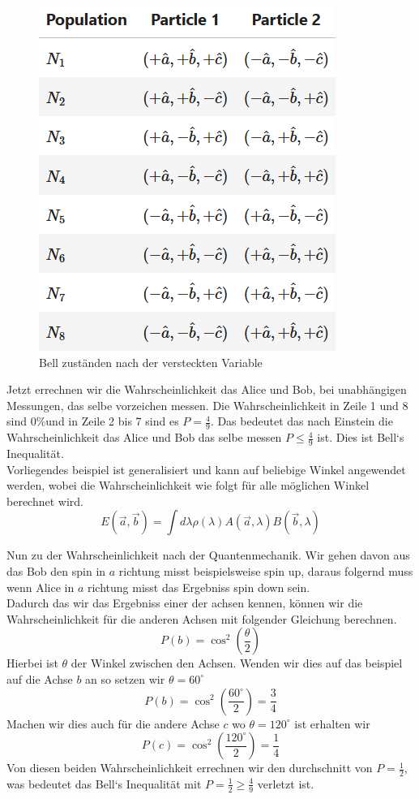 \begin{figure}[H]
    \centering
    \includegraphics[width=0.5\linewidth]{img/BellList.png}
    \caption{Bell zuständen nach der versteckten Variable}
    \label{fig:BellList}
\end{figure}

Jetzt errechnen wir die Wahrscheinlichkeit das Alice und Bob, bei unabhängigen Messungen, das selbe vorzeichen messen. Die Wahrscheinlichkeit in Zeile 1 und 8 sind $0\%$und in Zeile 2 bis 7 sind es $P = \frac{4}{9}$.
Das bedeutet das nach Einstein die Wahrscheinlichkeit das Alice und Bob das selbe messen $P \leq \frac{4}{9}$ ist. Dies ist Bell`s Inequalität.\\
Vorliegendes beispiel ist generalisiert und kann auf beliebige Winkel angewendet werden, wobei die Wahrscheinlichkeit wie folgt für alle möglichen Winkel berechnet wird.
\begin{equation}
    E(\overrightarrow{a}, \overrightarrow{b}) = \int d\lambda \rho(\lambda) A(\overrightarrow{a}, \lambda) B(\overrightarrow{b}, \lambda)
\end{equation}

Nun zu der Wahrscheinlichkeit nach der Quantenmechanik. Wir gehen davon aus das Bob den spin in $a$ richtung misst beispielsweise spin up, daraus folgernd muss wenn Alice in $a$ richtung misst das Ergebniss spin down sein.\\
Dadurch das wir das Ergebniss einer der achsen kennen, können wir die Wahrscheinlichkeit für die anderen Achsen mit folgender Gleichung berechnen.
\begin{equation}
    P(b) = \cos^2(\frac{\theta}{2})
\end{equation}
Hierbei ist $\theta$ der Winkel zwischen den Achsen. Wenden wir dies auf das beispiel auf die Achse $b$ an so setzen wir $\theta = 60^\circ$
\begin{equation}
    P(b) = \cos^2(\frac{60^\circ}{2}) = \frac{3}{4}
\end{equation}
Machen wir dies auch für die andere Achse $c$ wo $\theta = 120^\circ$ ist erhalten wir
\begin{equation}
    P(c) = \cos^2(\frac{120^\circ}{2}) = \frac{1}{4}
\end{equation}
Von diesen beiden Wahrscheinlichkeit errechnen wir den durchschnitt von $P = \frac{1}{2}$, was bedeutet das Bell`s Inequalität mit $P = \frac{1}{2} \ge \frac{4}{9}$ verletzt ist.\\

